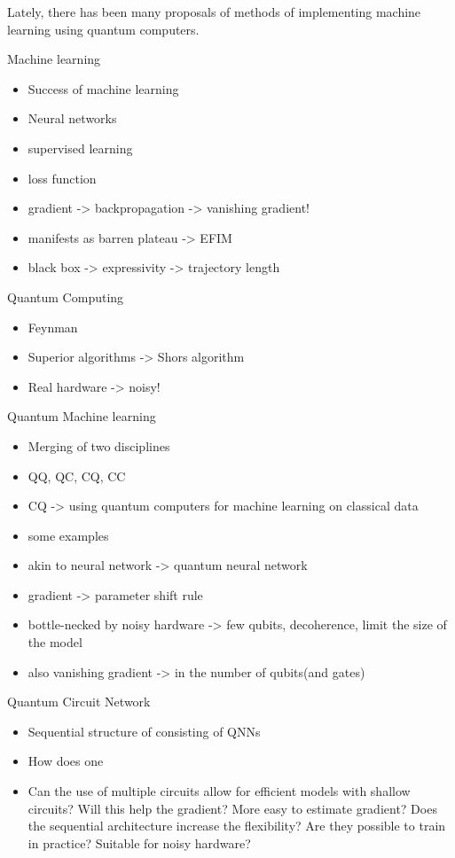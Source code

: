 Lately, there has been many proposals of methods of implementing machine learning using quantum computers. 






Machine learning
\begin{itemize}
    \item Success of machine learning
    \item Neural networks
    \item supervised learning
    \item loss function
    \item gradient -> backpropagation -> vanishing gradient!
    \item manifests as barren plateau -> EFIM
    \item black box -> expressivity -> trajectory length
\end{itemize}

Quantum Computing
\begin{itemize}
    \item Feynman
    \item Superior algorithms -> Shors algorithm
    \item Real hardware -> noisy!
\end{itemize}

Quantum Machine learning
\begin{itemize}
    \item Merging of two disciplines
    \item QQ, QC, CQ, CC
    \item CQ -> using quantum computers for machine learning on classical data
    \item some examples
    \item akin to neural network -> quantum neural network
    \item gradient -> parameter shift rule
    \item bottle-necked by noisy hardware -> few qubits, decoherence, limit the size of the model
    \item also vanishing gradient -> in the number of qubits(and gates)
\end{itemize}

Quantum Circuit Network
\begin{itemize}
    \item Sequential structure of consisting of QNNs
    \item How does one 
    \item Can the use of multiple circuits allow for efficient models with shallow circuits? Will this help the gradient? More easy to estimate gradient? Does the sequential architecture increase the flexibility? Are they possible to train in practice? Suitable for noisy hardware?
\end{itemize}



